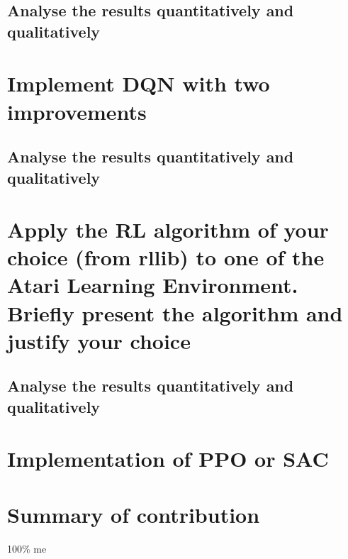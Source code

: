 \documentclass[a4pape, 11pt, english]{article}
\begin{document}
\subsection{Analyse the results quantitatively and qualitatively}

\section{Implement DQN with two improvements}

\subsection{Analyse the results quantitatively and qualitatively}

\section{Apply the RL algorithm of your choice (from rllib) to one of the Atari Learning Environment. Briefly present the algorithm and justify your choice}

\subsection{Analyse the results quantitatively and qualitatively}

\section{Implementation of PPO or SAC}

\section{Summary of contribution}
100\% me


\end{document}
